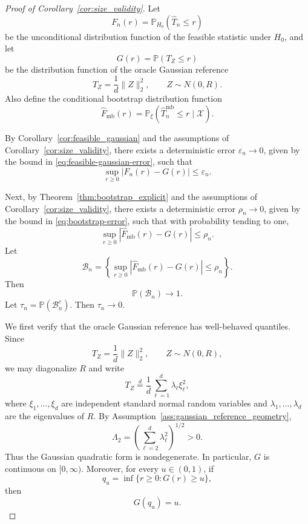 \documentclass[
  12pt]{article}
\theoremstyle{plain}
\theoremstyle{definition}
\theoremstyle{remark}
\begin{document}
\begin{proof}[Proof of Corollary~\ref{cor:size_validity}]
Let
\[
F_n(r)
=
\mathbb P_{H_0}(\widehat T_n\le r)
\]
be the unconditional distribution function of the feasible statistic under
\(H_0\), and let
\[
G(r)
=
\mathbb P(T_Z\le r)
\]
be the distribution function of the oracle Gaussian reference
\[
T_Z=\frac1d\|Z\|_2^2,
\qquad
Z\sim N(0,R).
\]
Also define the conditional bootstrap distribution function
\[
\widehat F_{\mathrm{mb}}(r)
=
\mathbb P_\xi
\left(
\widehat T_n^{\mathrm{mb}}\le r\mid\mathcal X
\right).
\]

By Corollary~\ref{cor:feasible_gaussian} and the assumptions of
Corollary~\ref{cor:size_validity}, there exists a deterministic error
\(\varepsilon_n\to0\), given by the bound in
\eqref{eq:feasible-gaussian-error}, such that
\begin{equation}
\label{eq:supp-size-feasible-kolmogorov}
\sup_{r\ge0}
|F_n(r)-G(r)|
\le
\varepsilon_n.
\end{equation}

Next, by Theorem~\ref{thm:bootstrap_explicit} and the assumptions of
Corollary~\ref{cor:size_validity}, there exists a deterministic error
\(\rho_n\to0\), given by the bound in \eqref{eq:bootstrap-error}, such that
with probability tending to one,
\begin{equation}
\label{eq:supp-size-bootstrap-kolmogorov}
\sup_{r\ge0}
\left|
\widehat F_{\mathrm{mb}}(r)-G(r)
\right|
\le
\rho_n.
\end{equation}
Let
\begin{equation}
\label{eq:supp-size-bootstrap-event}
\mathcal B_n
=
\left\{
\sup_{r\ge0}
\left|
\widehat F_{\mathrm{mb}}(r)-G(r)
\right|
\le \rho_n
\right\}.
\end{equation}
Then
\[
\mathbb P(\mathcal B_n)\to1.
\]
Let \(\tau_n=\mathbb P(\mathcal B_n^c)\).  Then \(\tau_n\to0\).

We first verify that the oracle Gaussian reference has well-behaved quantiles.
Since
\[
T_Z=\frac1d\|Z\|_2^2,
\qquad
Z\sim N(0,R),
\]
we may diagonalize \(R\) and write
\[
T_Z
\overset{d}{=}
\frac1d
\sum_{\ell=1}^d
\lambda_\ell \xi_\ell^2,
\]
where
\(\xi_1,\ldots,\xi_d\) are independent standard normal random variables and
\(\lambda_1,\ldots,\lambda_d\) are the eigenvalues of \(R\). By
Assumption~\ref{ass:gaussian_reference_geometry},
\[
\Lambda_2
=
\left(
\sum_{\ell=2}^d\lambda_\ell^2
\right)^{1/2}
>0.
\]
Thus the Gaussian quadratic form is nondegenerate. In particular, \(G\) is
continuous on \([0,\infty)\). Moreover, for every \(u\in(0,1)\), if
\[
q_u=\inf\{r\ge0:G(r)\ge u\},
\]
then
\[
G(q_u)=u.
\]


\end{proof}
\end{document}
